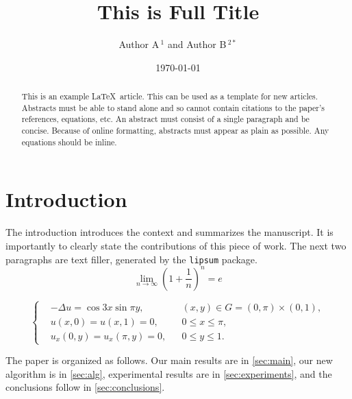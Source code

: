 \documentclass[10pt,reqno,final]{amsart}
\title[Short Title]{This is Full Title}
\author[Author A \; \& \; Author B]{Author A${\,}^{1}$ \quad and \quad Author B${\,}^{2*}$} %
\date{\today}
\numberwithin{equation}{section}
\numberwithin{figure}{section}
\numberwithin{table}{section}
\theoremstyle{plain}
\theoremstyle{definition}
\theoremstyle{remark}
\begin{document}
\begin{abstract}
  This is an example \LaTeX\ article. This can be used as a
  template for new articles.  Abstracts must be able to stand alone
  and so cannot contain citations to the paper's references,
  equations, etc.  An abstract must consist of a single paragraph and
  be concise. Because of online formatting, abstracts must appear as
  plain as possible. Any equations should be inline.
\end{abstract}


\maketitle


\section{Introduction}
The introduction introduces the context and summarizes the
manuscript. It is importantly to clearly state the contributions of
this piece of work. The next two paragraphs are text filler,
generated by the \texttt{lipsum} package.
\begin{equation}\label{equ01}
  \lim_{n\to\infty}\left(1+\frac{1}{n}\right)^n=e
\end{equation}

\lipsum[2]

\begin{equation}\label{mulequa1}
\left\{\begin{aligned}
&-\Delta u=\cos 3x \sin \pi y, && (x, y) \in G=(0, \pi) \times(0,1), \\
&u(x, 0)=u(x, 1)=0, && 0 \leqslant x \leqslant \pi, \\
&u_{x}(0, y)=u_{x}(\pi, y)=0, && 0 \leqslant y \leqslant 1.
\end{aligned}\right.
\end{equation}


The paper is organized as follows. Our main results are in
\ref{sec:main}, our new algorithm is in \ref{sec:alg}, experimental
results are in \ref{sec:experiments}, and the conclusions follow in
\ref{sec:conclusions}.
\end{document}
